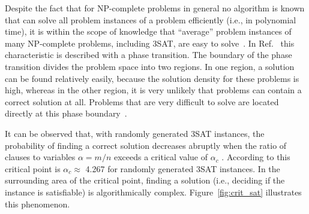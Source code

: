 %
%
%

Despite the fact that for NP-complete problems in general no algorithm is known that can solve all problem instances of a problem efficiently (i.e., in polynomial time), it is within the scope of knowledge that ``average'' problem instances of many NP-complete problems, including 3SAT, are easy to solve~\cite{cheeseman1991really}. In Ref.~\cite{monasson1999determining} this characteristic is described with a phase transition. The boundary of the phase transition divides the problem space into two regions. In one region, a solution can be found relatively easily, because the solution density for these problems is high, whereas in the other region, it is very unlikely that problems can contain a correct solution at all. Problems that are very difficult to solve are located directly at this phase boundary~\cite{cheeseman1991really}.

It can be observed that, with randomly generated 3SAT instances, the probability of finding a correct solution decreases abruptly when the ratio of clauses to variables $\alpha = m/n$ exceeds a critical value of $\alpha_{c}$ \cite{monasson1996entropy}. According to \cite{mezard2002random} this critical point is $\alpha_{c} \approx $ 4.267 for randomly generated 3SAT instances. In the surrounding area of the critical point, finding a solution (i.e., deciding if the instance is satisfiable) is algorithmically complex. Figure~\ref{fig:crit_sat} illustrates this phenomenon.


